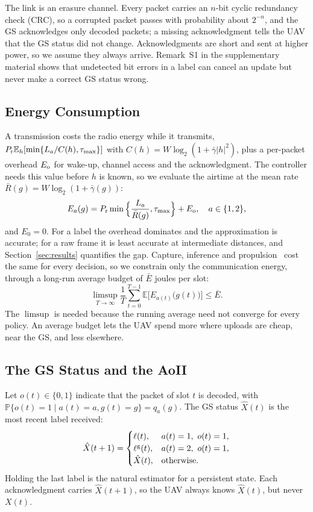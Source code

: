 \documentclass[10pt,journal,compsoc]{IEEEtran}
\theoremstyle{remark}
\newcommand{\E}{\mathbb{E}}
\newcommand{\Prob}{\mathbb{P}}
\newcommand{\lab}{\ell}
\begin{document}
The link is an erasure channel. Every packet carries an $n$-bit cyclic redundancy check (CRC), so a corrupted packet passes with probability about $2^{-n}$, and the GS acknowledges only decoded packets; a missing acknowledgment tells the UAV that the GS status did not change. Acknowledgments are short and sent at higher power, so we assume they always arrive. Remark~S1 in the supplementary material shows that undetected bit errors in a label can cancel an update but never make a correct GS status wrong.


\subsection{Energy Consumption}
A transmission costs the radio energy while it transmits, $P_{\rm r}\E_h[\min\{L_a/C(h),\tau_{\max}\}]$ with $C(h)=W\log_2(1+\bar\gamma|h|^2)$, plus a per-packet overhead $E_{\rm o}$ for wake-up, channel access and the acknowledgment. The controller needs this value before $h$ is known, so we evaluate the airtime at the mean rate $\bar R(g)=W\log_2(1+\bar\gamma(g))$:
\begin{equation}\label{eq:energy}
E_a(g)=P_{\rm r}\min\Big\{\frac{L_a}{\bar R(g)},\tau_{\max}\Big\}+E_{\rm o},\quad a\in\{1,2\},
\end{equation}
and $E_0=0$. For a label the overhead dominates and the approximation is accurate; for a raw frame it is least accurate at intermediate distances, and Section~\ref{sec:results} quantifies the gap. Capture, inference and propulsion~\cite{zeng2019rotary} cost the same for every decision, so we constrain only the communication energy, through a long-run average budget of $\bar E$ joules per slot:
\begin{equation}\label{eq:budget}
\limsup_{T\to\infty}\frac1T\sum_{t=0}^{T-1}\E\Big[E_{a(t)}\big(g(t)\big)\Big]\le\bar E.
\end{equation}
The $\limsup$ is needed because the running average need not converge for every policy. An average budget lets the UAV spend more where uploads are cheap, near the GS, and less elsewhere.

\subsection{The GS Status and the AoII}
Let $o(t)\in\{0,1\}$ indicate that the packet of slot $t$ is decoded, with $\Prob\{o(t)=1\mid a(t)=a,g(t)=g\}=q_a(g)$. The GS status $\hat X(t)$ is the most recent label received:
\begin{equation}\label{eq:est}
\hat X(t+1)=\begin{cases}\lab(t), & a(t)=1,\ o(t)=1,\\ \lab^{\rm g}(t), & a(t)=2,\ o(t)=1,\\ \hat X(t), & \text{otherwise.}\end{cases}
\end{equation}
Holding the last label is the natural estimator for a persistent state. Each acknowledgment carries $\hat X(t+1)$, so the UAV always knows $\hat X(t)$, but never $X(t)$.
\end{document}

